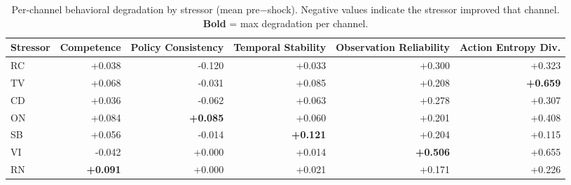 \begin{table}[t]
\centering
\small
\caption{Per-channel behavioral degradation by stressor (mean pre$-$shock). Negative values indicate the stressor improved that channel. \textbf{Bold} = max degradation per channel.}
\label{tab:channel}
\begin{tabular}{lrrrrr}
\toprule
Stressor & Competence & Policy Consistency & Temporal Stability & Observation Reliability & Action Entropy Div. \\
\midrule
RC & +0.038 & -0.120 & +0.033 & +0.300 & +0.323 \\
TV & +0.068 & -0.031 & +0.085 & +0.208 & \textbf{+0.659} \\
CD & +0.036 & -0.062 & +0.063 & +0.278 & +0.307 \\
ON & +0.084 & \textbf{+0.085} & +0.060 & +0.201 & +0.408 \\
SB & +0.056 & -0.014 & \textbf{+0.121} & +0.204 & +0.115 \\
VI & -0.042 & +0.000 & +0.014 & \textbf{+0.506} & +0.655 \\
RN & \textbf{+0.091} & +0.000 & +0.021 & +0.171 & +0.226 \\
\bottomrule
\end{tabular}
\end{table}